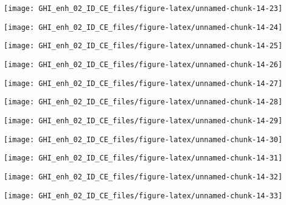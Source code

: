 \documentclass[
  10pt,
  a4paper,oneside]{article}
\begin{document}
\begin{center}\texttt{[image: GHI\_enh\_02\_ID\_CE\_files/figure-latex/unnamed-chunk-14-23]} \end{center}

\begin{center}\texttt{[image: GHI\_enh\_02\_ID\_CE\_files/figure-latex/unnamed-chunk-14-24]} \end{center}

\begin{center}\texttt{[image: GHI\_enh\_02\_ID\_CE\_files/figure-latex/unnamed-chunk-14-25]} \end{center}

\begin{center}\texttt{[image: GHI\_enh\_02\_ID\_CE\_files/figure-latex/unnamed-chunk-14-26]} \end{center}

\begin{center}\texttt{[image: GHI\_enh\_02\_ID\_CE\_files/figure-latex/unnamed-chunk-14-27]} \end{center}

\begin{center}\texttt{[image: GHI\_enh\_02\_ID\_CE\_files/figure-latex/unnamed-chunk-14-28]} \end{center}

\begin{center}\texttt{[image: GHI\_enh\_02\_ID\_CE\_files/figure-latex/unnamed-chunk-14-29]} \end{center}

\begin{center}\texttt{[image: GHI\_enh\_02\_ID\_CE\_files/figure-latex/unnamed-chunk-14-30]} \end{center}

\begin{center}\texttt{[image: GHI\_enh\_02\_ID\_CE\_files/figure-latex/unnamed-chunk-14-31]} \end{center}

\begin{center}\texttt{[image: GHI\_enh\_02\_ID\_CE\_files/figure-latex/unnamed-chunk-14-32]} \end{center}

\begin{center}\texttt{[image: GHI\_enh\_02\_ID\_CE\_files/figure-latex/unnamed-chunk-14-33]} \end{center}
\end{document}
